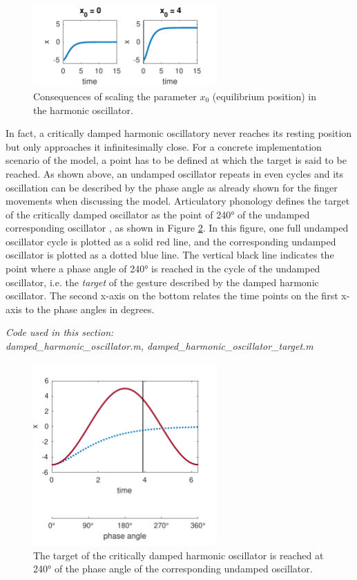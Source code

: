 \begin{figure}
\includegraphics[width=7cm]{figures/ch3/dho_x0.pdf}
\caption{Consequences of scaling the parameter $x_0$ (equilibrium position) in the harmonic oscillator.}
\label{fig:dho_rest}
\end{figure}

In fact, a critically damped harmonic oscillatory never reaches its resting position but only approaches it infinitesimally close. For a concrete implementation scenario of the model, a point has to be defined at which the target is said to be reached. As shown above, an undamped oscillator repeats in even cycles and its oscillation can be described by the phase angle as already shown for the finger movements when discussing the \citet{HakenKelsoBunz1985} model. Articulatory phonology defines the target of the critically damped oscillator as the point of 240° of the undamped corresponding oscillator \citep{BrowmanGoldstein1990}, as shown in Figure \ref{fig:dho_240}. In this figure, one full undamped oscillator cycle is plotted as a solid red line, and the corresponding undamped oscillator is plotted as a dotted blue line. The vertical black line indicates the point where a phase angle of 240° is reached in the cycle of the undamped oscillator, i.e. the \emph{target} of the gesture described by the damped harmonic oscillator. The second x-axis on the bottom relates the time points on the first x-axis to the phase angles in degrees.

\medskip\noindent\textit{Code used in this section: \\
damped\_harmonic\_oscillator.m, damped\_harmonic\_oscillator\_target.m}

\begin{figure}
\includegraphics[width=7cm]{figures/ch3/target_240_degrees.pdf}
\caption{The target of the critically damped harmonic oscillator is reached at 240° of the phase angle of the corresponding undamped oscillator.}
\label{fig:dho_240}
\end{figure}

